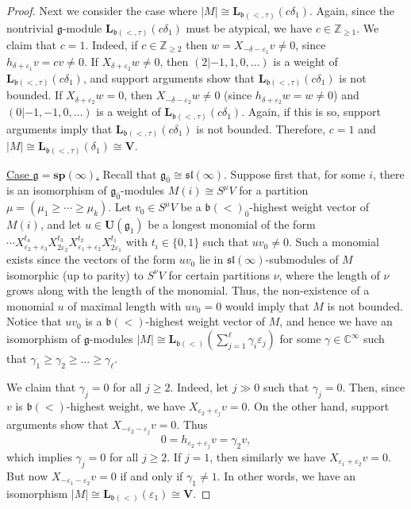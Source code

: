 \documentclass[12pt]{amsart}
\newcommand\C{\mathbb{C}}
\newcommand\Z{\mathbb{Z}}
\newcommand\g{\mathfrak{g}}
\newcommand\fb{\mathfrak{b}}
\newcommand\fsl{\mathfrak{sl}}
\newcommand\bV{\mathbf{V}}
\newcommand\bsp{\mathbf{sp}}
\newcommand\bU{\mathbf{U}}
\newcommand\bL{\mathbf{L}}
\theoremstyle{plain}
\theoremstyle{definition}
\numberwithin{equation}{section}
\begin{document}
\begin{proof}
Next we consider the case where $|M|\cong \bL_{\fb(<,\tau)}(c\delta_1)$. Again, since the nontrivial $\g$-module $\bL_{\fb(<,\tau)}(c\delta_1)$ must be atypical, we have $c \in \Z_{\geq 1}$. We claim that $c=1$. Indeed, if $c\in \Z_{\geq 2}$ then $w=X_{-\delta - \varepsilon_1}v\neq 0$, since $h_{\delta + \varepsilon_1}v=cv\neq 0$. If $X_{\delta + \varepsilon_2}w \neq 0$, then $(2|-1,1,0,\ldots)$ is a weight of $\bL_{\fb(<,\tau)}(c\delta_1)$, and support arguments show that $\bL_{\fb(<,\tau)}(c\delta_1)$ is not bounded. If $X_{\delta + \varepsilon_2}w = 0$, then $X_{-\delta - \varepsilon_2}w \neq 0$ (since $h_{\delta + \varepsilon_2}w = w\neq 0$) and $(0|-1,-1,0,\ldots)$ is a weight of $\bL_{\fb(<,\tau)}(c\delta_1)$. Again, if this is so, support arguments imply that $\bL_{\fb(<,\tau)}(c\delta_1)$ is not bounded. Therefore, $c=1$ and $|M| \cong \bL_{\fb(<,\tau)}(\delta_1)\cong \bV$.


\underline{Case $\g = \bsp(\infty)$.} Recall that $\g_{\bar 0}\cong \fsl(\infty)$.  Suppose first that, for some $i$, there is an isomorphism of $\g_{\bar 0}$-modules $M(i)\cong S^\mu V$ for a partition $\mu = (\mu_1\geq \cdots\geq \mu_k)$. Let $v_0 \in S^\mu V$ be a $\fb(<)_{\bar 0}$-highest weight vector of $M(i)$, and let $u\in \bU(\g_1)$ be a longest monomial of the form $\cdots X_{\varepsilon_2+\varepsilon_3}^{t_4}X_{2\varepsilon_2}^{t_3}X_{\varepsilon_1+\varepsilon_2}^{t_2}X_{2\varepsilon_1}^{t_1}$ with $t_i\in \{0,1\}$ such that $uv_0\neq 0$. Such a monomial exists since the vectors of the form $uv_0$ lie in $\fsl(\infty)$-submodules of $M$ isomorphic (up to parity) to $S^\nu V$ for certain partitions $\nu$, where the length of $\nu$ grows along with the length of the monomial. Thus, the non-existence of a monomial $u$ of maximal length with $uv_0=0$ would imply that $M$ is not bounded. Notice that $uv_0$ is a $\fb(<)$-highest weight vector of $M$, and hence we have an isomorphism of $\g$-modules $|M|\cong \bL_{\fb(<)}(\sum_{j=1}^\ell \gamma_i\varepsilon_j)$ for some $\gamma \in \C^\infty$ such that $\gamma_1\geq \gamma_2\geq \ldots \geq \gamma_\ell$.

We claim that $\gamma_j=0$ for all $j\geq 2$. Indeed, let $j\gg 0$ such that $\gamma_j=0$. Then, since $v$ is $\fb(<)$-highest weight, we have $X_{\varepsilon_2 + \varepsilon_j}v=0$. On the other hand, support arguments show that $X_{-\varepsilon_2 - \varepsilon_j}v=0$. Thus
	\[
0 = h_{\varepsilon_2 + \varepsilon_j}v = \gamma_2 v,
	\]
which implies $\gamma_j=0$ for all $j\geq 2$. If $j=1$, then similarly we have $X_{\varepsilon_1 + \varepsilon_2}v=0$. But now $X_{-\varepsilon_1 - \varepsilon_2}v=0$ if and only if $\gamma_1\neq 1$. In other words, we have an isomorphism $|M|\cong \bL_{\fb(<)} (\varepsilon_1)\cong \bV$. 


\end{proof}
\end{document}
